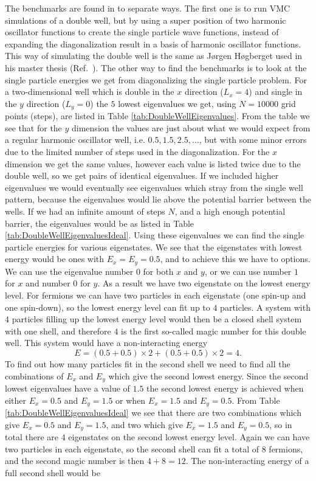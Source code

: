 \documentclass[../main.tex]{subfiles}
\begin{document}
The benchmarks are found in to separate ways. The first one is to run VMC simulations of a double well, but by using a super position of two harmonic oscillator functions to create the single particle wave functions, instead of expanding the diagonalization result in a basis of harmonic oscillator functions. This way of simulating the double well is the same as Jørgen Høgberget used in his master thesis (Ref.~\cite{}). The other way to find the benchmarks is to look at the single particle energies we get from diagonalizing the single particle problem. For a two-dimensional well which is double in the $x$ direction ($L_x = 4$) and single in the $y$ direction ($L_y = 0$) the $5$ lowest eigenvalues we get, using $N=10000$ grid points (steps), are listed in Table \ref{tab:DoubleWellEigenvalues}. From the table we see that for the $y$ dimension the values are just about what we would expect from a regular harmonic oscillator well, i.e. $0.5, 1.5, 2.5, \dots$, but with some minor errors due to the limited number of steps used in the diagonalization. For the $x$ dimension we get the same values, however each value is listed twice due to the double well, so we get pairs of identical eigenvalues. If we included higher eigenvalues we would eventually see eigenvalues which stray from the single well pattern, because the eigenvalues would lie above the potential barrier between the wells. If we had an infinite amount of steps $N$, and a high enough potential barrier, the eigenvalues would be as listed in Table \ref{tab:DoubleWellEigenvaluesIdeal}. Using these eigenvalues we can find the single particle energies for various eigenstates. We see that the eigenstates with lowest energy would be ones with $E_x=E_y=0.5$, and to achieve this we have to options. We can use the eigenvalue number $0$ for both $x$ and $y$, or we can use number $1$ for $x$ and number $0$ for $y$. As a result we have two eigenstate on the lowest energy level. For fermions we can have two particles in each eigenstate (one spin-up and one spin-down), so the lowest energy level can fit up to $4$ particles. A system with $4$ particles filling up the lowest energy level would then be a closed shell system with one shell, and therefore $4$ is the first so-called magic number for this double well. This system would have a non-interacting energy 
\begin{equation}
    E = (0.5+0.5)\times 2 + (0.5+0.5)\times 2 = 4.
\end{equation} 
To find out how many particles fit in the second shell we need to find all the combinations of $E_x$ and $E_y$ which give the second lowest energy. Since the second lowest eigenvalues have a value of $1.5$ the second lowest energy is achieved when either $E_x = 0.5$ and $E_y = 1.5$ or when $E_x = 1.5$ and $E_y = 0.5$. From Table \ref{tab:DoubleWellEigenvaluesIdeal} we see that there are two combinations which give $E_x = 0.5$ and $E_y = 1.5$, and two which give $E_x = 1.5$ and $E_y = 0.5$, so in total there are $4$ eigenstates on the second lowest energy level. Again we can have two particles in each eigenstate, so the second shell can fit a total of $8$ fermions, and the second magic number is then $4 + 8 = 12$. The non-interacting energy of a full second shell would be
\end{document}
